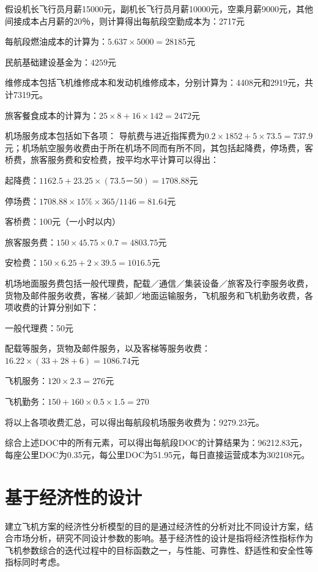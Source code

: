 假设机长飞行员月薪15000元，副机长飞行员月薪10000元，空乘月薪9000元，其他间接成本占月薪的20％，则计算得出每航段空勤成本为：2717元

每航段燃油成本的计算为：$5.637\times5000=28185$元

民航基础建设基金为：$4259$元

维修成本包括飞机维修成本和发动机维修成本，分别计算为：4408元和2919元，共计7319元。

旅客餐食成本的计算为：$25\times8+16\times142=2472$元

机场服务成本包括如下各项：
导航费与进近指挥费为$0.2\times1852+5\times73.5=737.9$元；机场航空服务收费由于所在机场不同而有所不同，其包括起降费，停场费，客桥费，旅客服务费和安检费，按平均水平计算可以得出：

起降费：$1162.5+23.25\times(73.5－50)=1708.88$元

停场费：$1708.88\times15\%\times365/1146=81.64$元

客桥费：100元（一小时以内）

旅客服务费：$150\times45.75\times0.7=4803.75$元

安检费：$150\times6.25+2\times39.5=1016.5$元

机场地面服务费包括一般代理费，配载／通信／集装设备／旅客及行李服务收费，货物及邮件服务收费，客梯／装卸／地面运输服务，飞机服务和飞机勤务收费，各项收费的计算分别如下：

一般代理费：50元

配载等服务，货物及邮件服务，以及客梯等服务收费：
$16.22\times(33+28+6)=1086.74$元

飞机服务：$120\times2.3=276$元

飞机勤务：$150+160\times0.5\times1.5=270$%

将以上各项收费汇总，可以得出每航段机场服务收费为：9279.23元。

综合上述DOC中的所有元素，可以得出每航段DOC的计算结果为：96212.83元，每座公里DOC为0.35元，每公里DOC为51.95元，每日直接运营成本为302108元。

\section{基于经济性的设计}\label{c13.4}
建立飞机方案的经济性分析模型的目的是通过经济性的分析对比不同设计方案，结合市场分析，研究不同设计参数的影响。基于经济性的设计是指将经济性指标作为飞机参数综合的迭代过程中的目标函数之一，与性能、可靠性、舒适性和安全性等指标同时考虑。


